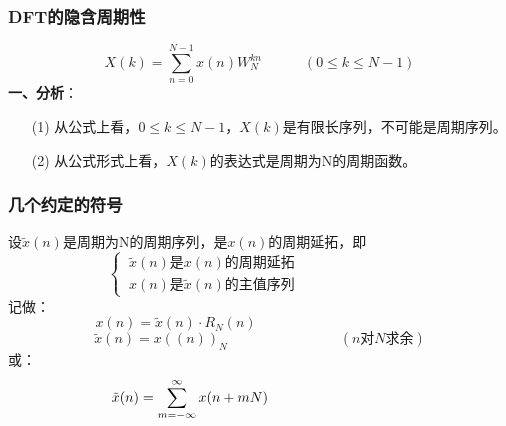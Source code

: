 \documentclass[notheorems,compress,mathserif,table]{beamer}
\begin{document}
\begin{frame}[shrink]\frametitle{DFT的隐含周期性}%
$$X(k) = \sum_{n=0}^{N-1}x(n) W_N^{kn} \quad\quad\quad (0 \leq k \leq N-1) $$
\textbf{一、分析}：
\begin{enumerate}
  \item [(1)]从公式上看，$0 \leq k \leq N-1$，$X(k)$是有限长序列，不可能是周期序列。
  \item [(2)]从公式形式上看，$X(k)$的表达式是周期为N的周期函数。
\end{enumerate}

%
\end{frame}
%
%
%
\begin{frame}[shrink]\frametitle{几个约定的符号}%


设$\tilde{x}(n)$是周期为N的周期序列，是$x(n)$的周期延拓，即
\begin{equation*}
    \left\{ \begin{aligned}
    \:\tilde{x}(n)\mbox{是$x(n)$的周期延拓}\qquad\qquad\qquad\qquad \\
    \:x(n)\mbox{是$\tilde{x}(n)$的主值序列}\qquad\qquad\qquad\qquad
    \end{aligned} \right.
\end{equation*}
记做：
$$  x(n) = \tilde{x}(n)\cdot R_N(n) \qquad\qquad\qquad\quad\quad\quad\quad\quad\quad$$
$$  \tilde{x}(n)   = x((n))_N  \qquad\qquad\qquad\quad\quad (\mbox{$n$对$N$求余})$$
\quad\quad 或：
$$\mbox{\quad\quad }  \tilde{x}(n)= \sum_{m=-\infty}^{\infty}x(n+mN)\qquad\qquad\qquad\quad\quad\quad\quad\quad\quad$$
\end{frame}
\end{document}
